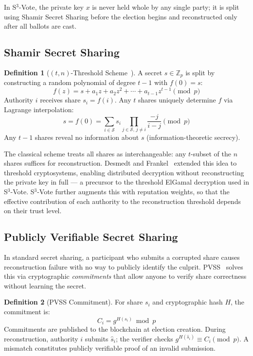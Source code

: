 \documentclass[12pt,a4paper]{article}
\theoremstyle{definition}
\newtheorem{definition}{Definition}[section]
\theoremstyle{remark}
\begin{document}
In S$^3$-Vote, the private key $x$ is never held whole by any single party;
it is split using Shamir Secret Sharing before the election begins and
reconstructed only after all ballots are cast.

\subsection{Shamir Secret Sharing}

\begin{definition}[$(t,n)$-Threshold Scheme~\cite{shamir1979}]
  A secret $s \in \mathbb{Z}_p$ is split by constructing a random polynomial
  of degree $t{-}1$ with $f(0) = s$:
  \begin{equation}
    f(z) = s + a_1 z + a_2 z^2 + \cdots + a_{t-1} z^{t-1} \pmod{p}
  \end{equation}
  Authority $i$ receives share $s_i = f(i)$.
  Any $t$ shares uniquely determine $f$ via Lagrange interpolation:
  \begin{equation}
    s = f(0) = \sum_{i \in \mathcal{S}} s_i \prod_{j \in \mathcal{S},\, j \neq i}
    \frac{-j}{i-j} \pmod{p}
  \end{equation}
  Any $t-1$ shares reveal no information about $s$ (information-theoretic
  secrecy).
\end{definition}

The classical scheme treats all shares as interchangeable: any $t$-subset
of the $n$ shares suffices for reconstruction.
Desmedt and Frankel~\cite{desmedt1990} extended this idea to threshold
cryptosystems, enabling distributed decryption without reconstructing the
private key in full — a precursor to the threshold ElGamal decryption used
in S$^3$-Vote.
S$^3$-Vote further augments this with reputation weights, so that the
effective contribution of each authority to the reconstruction threshold depends
on their trust level.

\subsection{Publicly Verifiable Secret Sharing}

In standard secret sharing, a participant who submits a corrupted share
causes reconstruction failure with no way to publicly identify the culprit.
PVSS~\cite{schoenmakers1999,pedersen1991} solves this via cryptographic
\emph{commitments} that allow anyone to verify share correctness without
learning the secret.

\begin{definition}[PVSS Commitment]
  For share $s_i$ and cryptographic hash $H$, the commitment is:
  \begin{equation}
    C_i = g^{H(s_i)} \bmod p
    \label{eq:commitment}
  \end{equation}
  Commitments are published to the blockchain at election creation.
  During reconstruction, authority $i$ submits $\hat{s}_i$; the verifier
  checks $g^{H(\hat{s}_i)} \equiv C_i \pmod{p}$.
  A mismatch constitutes publicly verifiable proof of an invalid submission.
\end{definition}
\end{document}

